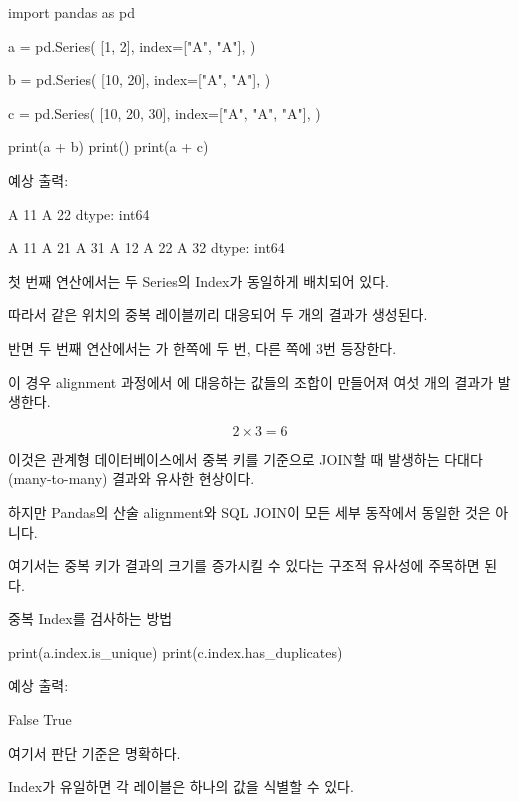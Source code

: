 \begin{dhkcode}
import pandas as pd

a = pd.Series(
    [1, 2],
    index=["A", "A"],
)

b = pd.Series(
    [10, 20],
    index=["A", "A"],
)

c = pd.Series(
    [10, 20, 30],
    index=["A", "A", "A"],
)

print(a + b)
print()
print(a + c)
\end{dhkcode}

예상 출력:

\begin{dhkzsh}
A    11
A    22
dtype: int64

A    11
A    21
A    31
A    12
A    22
A    32
dtype: int64
\end{dhkzsh}

첫 번째 연산에서는 두 Series의 Index가 동일하게 배치되어 있다.

따라서 같은 위치의 중복 레이블끼리 대응되어 두 개의 결과가 생성된다.

반면 두 번째 연산에서는 가 한쪽에 두 번, 다른 쪽에 3번 등장한다.

이 경우 alignment 과정에서 에 대응하는 값들의 조합이 만들어져 여섯 개의 결과가 발생한다.

\[
2\times3=6
\]

이것은 관계형 데이터베이스에서 중복 키를 기준으로 JOIN할 때 발생하는 다대다 (many-to-many) 결과와 유사한 현상이다.

하지만 Pandas의 산술 alignment와 SQL JOIN이 모든 세부 동작에서 동일한 것은 아니다.

여기서는 중복 키가 결과의 크기를 증가시킬 수 있다는 구조적 유사성에 주목하면 된다.

\begin{dhknote}
\begin{dhksmry}[centered]
중복 Index를 검사하는 방법
\end{dhksmry}
\end{dhknote}

\begin{dhkcode}
print(a.index.is_unique)
print(c.index.has_duplicates)
\end{dhkcode}

예상 출력:

\begin{dhkzsh}
False
True
\end{dhkzsh}

여기서 판단 기준은 명확하다.

Index가 유일하면 각 레이블은 하나의 값을 식별할 수 있다.

